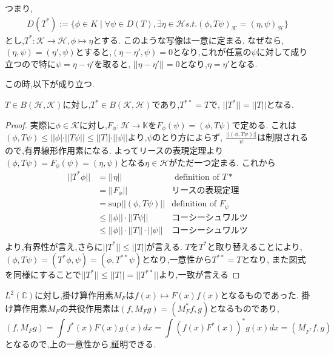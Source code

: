 \documentclass[uplatex]{jsbook}
\begin{document}
つまり,
\begin{align*}
    D(T^*):= \{ \phi \in K \mid \forall \psi \in D(T), \exists \eta\in \mathcal{H} s.t. (\phi, T\psi)_{\mathcal{K}} = (\eta, \psi)_{\mathcal{H}}  \}
\end{align*}
とし,$T^*: \mathcal{K} \to \mathcal{H}, \phi \mapsto \eta$とする.
このような写像は一意に定まる.
なぜなら,$(\eta, \psi) = (\eta', \psi)$とすると,$(\eta - \eta' , \psi) = 0$となり,これが任意の$\psi$に対して成り立つので特に$\psi = \eta- \eta'$を取ると,
$||\eta - \eta'|| = 0$となり,$\eta = \eta'$となる.

この時,以下が成り立つ.
\begin{prop}
 $T \in B(\mathcal{H},\mathcal{K})$に対し,$T^* \in B(\mathcal{K}, \mathcal{H})$であり,$T^{**}=T$で,
 $||T^*|| = ||T||$となる.
\end{prop}
\begin{proof}
  実際に$\phi \in \mathcal{K}$に対し,$F_{\phi}:\mathcal{H} \to \mathbb{K}$を$F_{\phi}(\psi) = (\phi, T \psi)$で定める.
  これは$(\phi, T \psi) \le ||\phi| \cdot ||T \psi|| \le ||T|| \cdot ||\psi||$より,$\psi$のとり方によらず,
  $\frac{||(\phi, T\psi)||}{\psi}$は制限されるので,有界線形作用素になる.
  よってリースの表現定理より$(\phi , T\psi) = F_{\phi}(\psi) = (\eta, \psi)$となる$\eta \in \mathcal{H}$がただ一つ定まる.
  これから
  \begin{align*}
   ||T^* \phi || & = ||\eta|| &  \mbox{ definition of }T* \\
                & = ||F_{\phi}|| & \mbox{リースの表現定理} \\
                & = \mathrm{sup} ||(\phi, T \psi)||  & \mbox{definition of }F_{\psi}\\
                & \le ||\phi|| \cdot ||T \psi|| & \mbox{コーシーシュワルツ} \\
                & \le ||\phi|| \cdot ||T|| \cdot ||\psi||  & \mbox{コーシーシュワルツ} \\
  \end{align*}
  より,有界性が言え,さらに$||T^*|| \le ||T||$が言える.
  $T$を$T^*$と取り替えることにより,
  $(\phi, T\psi) = (T^* \phi, \psi) = (\phi, T^{**}\psi)$となり,一意性から$T^{**} = T$となり,
  また図式を同様にすることで$||T^*||  \le ||T|| = ||T^{**}||$より,一致が言える
\end{proof}

\begin{epl}
$L^2(\mathbb{C})$に対し,掛け算作用素$M_F$は$f(x) \mapsto F(x) f(x)$となるものであった.
掛け算作用素$M_F$の共役作用素は$(f, M_Fg)  = (M_F^*f, g)$となるものであり,
\begin{equation*}
 (f, M_Fg)  = \int f^*(x)F(x)g(x)dx = \int (f(x) F^*(x))^* g(x) dx = (M_{F^*}f, g)
\end{equation*}
となるので,上の一意性から,証明できる.
\end{epl}
\end{document}
